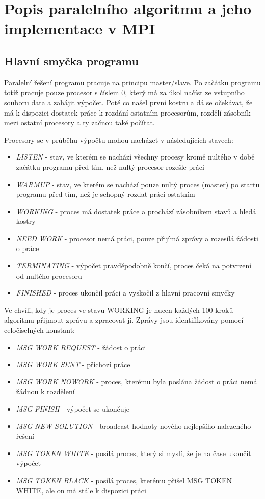 \documentclass[]{article}
\begin{document}
\section{Popis paralelního algoritmu a jeho implementace v MPI}

\subsection{Hlavní smyčka programu}
Paralelní řešení programu pracuje na principu master/slave. Po začátku programu totiž pracuje pouze procesor s číslem 0, který má za úkol načíst ze vstupního souboru data a zahájit výpočet. Poté co našel první kostru a dá se očekávat, že má k dispozici dostatek práce k rozdání ostatním procesorům, rozdělí zásobník mezi ostatní procesory a ty začnou také počítat.

Procesory se v průběhu výpočtu mohou nacházet v následujících stavech:
\begin{itemize}
  \item \textit{LISTEN} - stav, ve kterém se nachází všechny procesy kromě nultého v době začátku programu před tím, než nultý procesor rozešle práci
  \item \textit{WARMUP} - stav, ve kterém se nachází pouze nultý proces (master) po startu programu před tím, než je schopný rozdat práci ostatním
  \item \textit{WORKING} - proces má dostatek práce a prochází zásobníkem stavů a hledá kostry
  \item \textit{NEED WORK} - procesor nemá práci, pouze přijímá zprávy a rozesílá žádosti o práce
  \item \textit{TERMINATING} - výpočet pravděpodobně končí, proces čeká na potvrzení od nultého procesoru
  \item \textit{FINISHED} - proces ukončil práci a vyskočil z hlavní pracovní smyčky
\end{itemize}

Ve chvíli, kdy je proces ve stavu WORKING je nucen každých 100 kroků algoritmu přijmout zprávu a zpracovat ji. Zprávy jsou identifikovány pomocí celočíselných konstant:

\begin{itemize}
  \item \textit{MSG WORK REQUEST} - žádost o práci
  \item \textit{MSG WORK SENT} - příchozí práce
  \item \textit{MSG WORK NOWORK} - proces, kterému byla poslána žádost o práci nemá žádnou k rozdělení
  \item \textit{MSG FINISH} - výpočet se ukončuje
  \item \textit{MSG NEW SOLUTION} - broadcast hodnoty nového nejlepšího nalezeného řešení
  \item \textit{MSG TOKEN WHITE} - posílá proces, který si myslí, že je na čase ukončit výpočet
  \item \textit{MSG TOKEN BLACK } - posílá proces, kterému přišel MSG TOKEN WHITE, ale on má stále k dispozici práci
\end{itemize}
\end{document}
